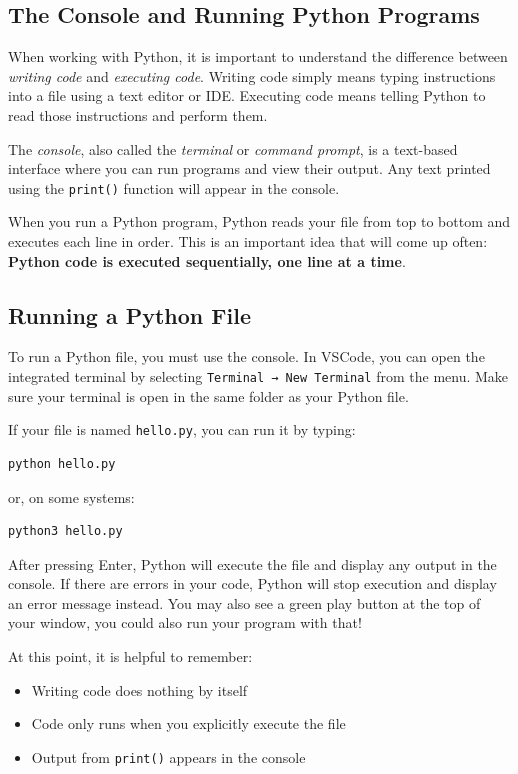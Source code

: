 \subsection{The Console and Running Python Programs}

When working with Python, it is important to understand the difference between
\emph{writing code} and \emph{executing code}. Writing code simply means typing
instructions into a file using a text editor or IDE. Executing code means telling
Python to read those instructions and perform them.

The \emph{console}, also called the \emph{terminal} or \emph{command prompt}, is a
text-based interface where you can run programs and view their output. Any text
printed using the \texttt{print()} function will appear in the console.

When you run a Python program, Python reads your file from top to bottom and
executes each line in order. This is an important idea that will come up often:
\textbf{Python code is executed sequentially, one line at a time}.

\subsection{Running a Python File}

To run a Python file, you must use the console. In VSCode, you can open the
integrated terminal by selecting \texttt{Terminal → New Terminal} from the menu.
Make sure your terminal is open in the same folder as your Python file.

If your file is named \texttt{hello.py}, you can run it by typing:

\begin{verbatim}
python hello.py
\end{verbatim}

or, on some systems:

\begin{verbatim}
python3 hello.py
\end{verbatim}

After pressing Enter, Python will execute the file and display any output in the
console. If there are errors in your code, Python will stop execution and display
an error message instead. You may also see a green play button at the top of your window, you could also run your program with that!

At this point, it is helpful to remember:
\begin{itemize}
    \item Writing code does nothing by itself
    \item Code only runs when you explicitly execute the file
    \item Output from \texttt{print()} appears in the console
\end{itemize}



